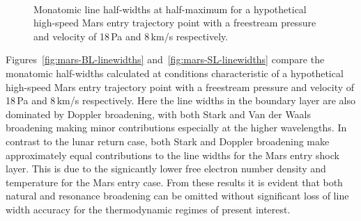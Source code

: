  \begin{figure}[p!]
 \center
  \\
 \caption{Monatomic line half-widths at half-maximum for a hypothetical high-speed Mars entry trajectory point with a freestream pressure and velocity of 18\,Pa and 8\,km/s respectively.}
 \label{fig:mars-linewidths}
\end{figure}

\par 

Figures~\ref{fig:mars-BL-linewidths} and~\ref{fig:mars-SL-linewidths} compare the monatomic half-widths calculated at conditions characteristic of a hypothetical high-speed Mars entry trajectory point with a freestream pressure and velocity of 18\,Pa and 8\,km/s respectively.
Here the line widths in the boundary layer are also dominated by Doppler broadening, with both Stark and Van der Waals broadening making minor contributions especially at the higher wavelengths.
In contrast to the lunar return case, both Stark and Doppler broadening make approximately equal contributions to the line widths for the Mars entry shock layer.
This is due to the signicantly lower free electron number density and temperature for the Mars entry case.
From these results it is evident that both natural and resonance broadening can be omitted without significant loss of line width accuracy for the thermodynamic regimes of present interest.


